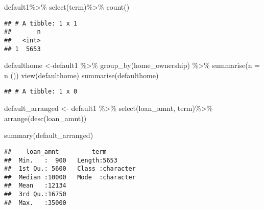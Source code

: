 \documentclass[
]{article}
\newenvironment{Shaded}{\begin{snugshade}}{\end{snugshade}}
\newcommand{\AttributeTok}[1]{\textcolor[rgb]{0.77,0.63,0.00}{#1}}
\newcommand{\FunctionTok}[1]{\textcolor[rgb]{0.00,0.00,0.00}{#1}}
\newcommand{\NormalTok}[1]{#1}
\newcommand{\OtherTok}[1]{\textcolor[rgb]{0.56,0.35,0.01}{#1}}
\newcommand{\SpecialCharTok}[1]{\textcolor[rgb]{0.00,0.00,0.00}{#1}}
\begin{document}
\begin{Shaded}
\begin{Highlighting}[]
\NormalTok{default1}\SpecialCharTok{\%\textgreater{}\%}
  \FunctionTok{select}\NormalTok{(term)}\SpecialCharTok{\%\textgreater{}\%}
\FunctionTok{count}\NormalTok{()}
\end{Highlighting}
\end{Shaded}

\begin{verbatim}
## # A tibble: 1 x 1
##       n
##   <int>
## 1  5653
\end{verbatim}

\begin{Shaded}
\begin{Highlighting}[]
\NormalTok{defaulthome }\OtherTok{\textless{}{-}}\NormalTok{default1 }\SpecialCharTok{\%\textgreater{}\%} 
  \FunctionTok{group\_by}\NormalTok{(home\_ownership) }\SpecialCharTok{\%\textgreater{}\%}
  \FunctionTok{summarise}\NormalTok{(}\AttributeTok{n =} \FunctionTok{n}\NormalTok{ ())}
\FunctionTok{view}\NormalTok{(defaulthome)}
\FunctionTok{summarise}\NormalTok{(defaulthome)}
\end{Highlighting}
\end{Shaded}

\begin{verbatim}
## # A tibble: 1 x 0
\end{verbatim}

\begin{Shaded}
\begin{Highlighting}[]
\NormalTok{default\_arranged }\OtherTok{\textless{}{-}}\NormalTok{ default1 }\SpecialCharTok{\%\textgreater{}\%}
  \FunctionTok{select}\NormalTok{(loan\_amnt, term)}\SpecialCharTok{\%\textgreater{}\%}
  \FunctionTok{arrange}\NormalTok{(}\FunctionTok{desc}\NormalTok{(loan\_amnt))}
\end{Highlighting}
\end{Shaded}

\begin{Shaded}
\begin{Highlighting}[]
\FunctionTok{summary}\NormalTok{(default\_arranged)}
\end{Highlighting}
\end{Shaded}

\begin{verbatim}
##    loan_amnt         term          
##  Min.   :  900   Length:5653       
##  1st Qu.: 5600   Class :character  
##  Median :10000   Mode  :character  
##  Mean   :12134                     
##  3rd Qu.:16750                     
##  Max.   :35000
\end{verbatim}
\end{document}
